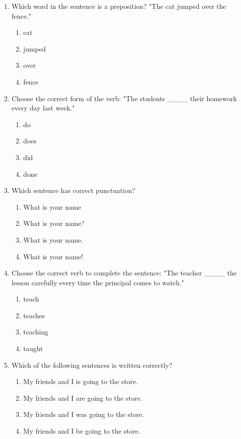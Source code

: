 \documentclass[12pt]{article}
\begin{document}
\begin{enumerate}
    \item Which word in the sentence is a preposition? "The cat jumped over the fence."  
    \begin{enumerate}[label=\Alph*.]
        \item cat
        \item jumped
        \item over
        \item fence
    \end{enumerate}
    \vspace{0.5cm}

    \item Choose the correct form of the verb:  
    "The students \_\_\_\_ their homework every day last week."  
    \begin{enumerate}[label=\Alph*.]
        \item do
        \item does
        \item did
        \item done
    \end{enumerate}
    \vspace{0.5cm}

    \item Which sentence has correct punctuation?  
    \begin{enumerate}[label=\Alph*.]
        \item What is your name
        \item What is your name?
        \item What is your name.
        \item What is your name!
    \end{enumerate}
    \vspace{0.5cm}

    \item Choose the correct verb to complete the sentence:  
    "The teacher \_\_\_\_ the lesson carefully every time the principal comes to watch."  
    \begin{enumerate}[label=\Alph*.]
        \item teach
        \item teaches
        \item teaching
        \item taught
    \end{enumerate}
    \vspace{0.5cm}

    \item Which of the following sentences is written correctly?  
    \begin{enumerate}[label=\Alph*.]
        \item My friends and I is going to the store.
        \item My friends and I are going to the store.
        \item My friends and I was going to the store.
        \item My friends and I be going to the store.
    \end{enumerate}
    \vspace{0.5cm}


\end{enumerate}
\end{document}
